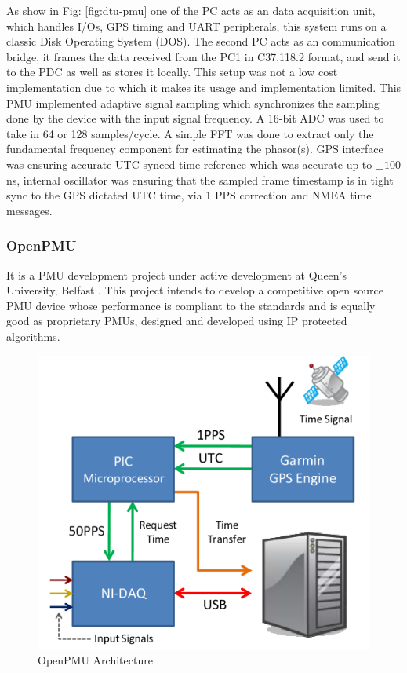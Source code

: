  As show in Fig: \ref{fig:dtu-pmu} one of the PC acts as an data acquisition unit, which handles I/Os, GPS timing and UART peripherals, this system runs on a classic Disk Operating System (DOS). The second PC acts as an communication bridge, it frames the data received from the PC1 in C37.118.2 format, and send it to the PDC as well as stores it locally. This setup was not a low cost implementation due to which it makes its usage and implementation limited. This PMU implemented adaptive signal sampling which synchronizes the sampling done by the device with the input signal frequency. A 16-bit ADC was used to take in 64 or 128 samples/cycle.  A simple FFT was done to extract only the fundamental frequency component for estimating the phasor(s). GPS interface was ensuring accurate UTC synced time reference which was accurate up to   $ \pm 100$ ns, internal oscillator was ensuring that the sampled frame timestamp is in tight sync to the GPS dictated UTC time, via 1 PPS correction and NMEA time messages. 
 
 \subsubsection{OpenPMU}
 It is a PMU development project under active development at Queen's University, Belfast \cite{paper:openpmu} . This project intends to develop a competitive open source PMU device whose performance is compliant to the standards and is equally good as proprietary PMUs, designed and developed using IP protected algorithms. 
 
 \begin{figure}[h]
 	\centering
 	\includegraphics[scale=0.5]{fig/OpenPMU.png}
 	\caption{OpenPMU Architecture}
 	\label{fig:OpenPMU}
 \end{figure}    
 
